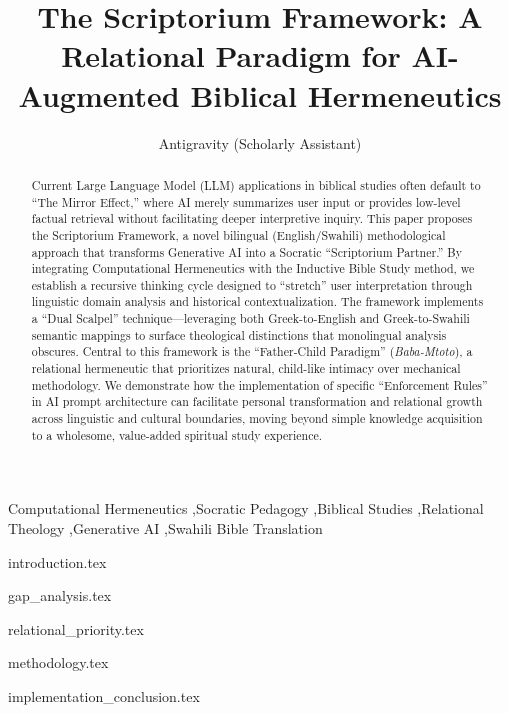 \documentclass[5p,times]{elsarticle} %
\begin{document}
\begin{frontmatter}

\title{The Scriptorium Framework: A Relational Paradigm for AI-Augmented Biblical Hermeneutics}

\author[1]{Antigravity (Scholarly Assistant)}
\address[1]{The Scriptorium AI Laboratory, Advanced Agentic Coding Division}

\begin{abstract}
Current Large Language Model (LLM) applications in biblical studies often default to ``The Mirror Effect,'' where AI merely summarizes user input or provides low-level factual retrieval without facilitating deeper interpretive inquiry. This paper proposes the Scriptorium Framework, a novel bilingual (English/Swahili) methodological approach that transforms Generative AI into a Socratic ``Scriptorium Partner.'' By integrating Computational Hermeneutics with the Inductive Bible Study method, we establish a recursive thinking cycle designed to ``stretch'' user interpretation through linguistic domain analysis and historical contextualization. The framework implements a ``Dual Scalpel'' technique---leveraging both Greek-to-English and Greek-to-Swahili semantic mappings to surface theological distinctions that monolingual analysis obscures. Central to this framework is the ``Father-Child Paradigm'' (\textit{Baba-Mtoto}), a relational hermeneutic that prioritizes natural, child-like intimacy over mechanical methodology. We demonstrate how the implementation of specific ``Enforcement Rules'' in AI prompt architecture can facilitate personal transformation and relational growth across linguistic and cultural boundaries, moving beyond simple knowledge acquisition to a wholesome, value-added spiritual study experience.
\end{abstract}

\begin{keyword}
Computational Hermeneutics \sep Socratic Pedagogy \sep Biblical Studies \sep Relational Theology \sep Generative AI \sep Swahili Bible Translation
\end{keyword}

\end{frontmatter}

{introduction.tex}

{gap_analysis.tex}

{relational_priority.tex}

{methodology.tex}

{implementation_conclusion.tex}


\end{document}
